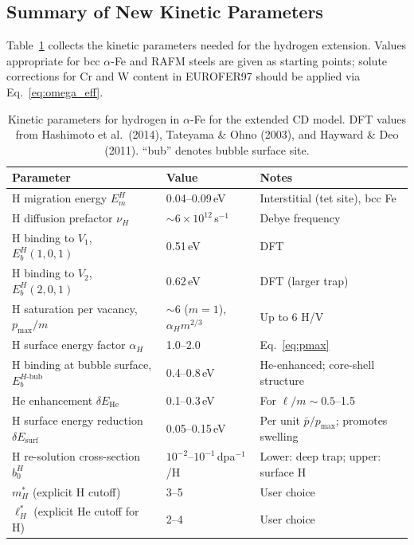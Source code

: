 \documentclass[pdflatex,sn-basic]{sn-jnl} %
\begin{document}
\subsection{Summary of New Kinetic Parameters}
\label{sec:H_params}

Table~\ref{tab:H_params} collects the kinetic parameters needed for the
hydrogen extension.  Values appropriate for bcc $\alpha$-Fe and RAFM
steels are given as starting points; solute corrections for Cr and W
content in EUROFER97 should be applied via Eq.~\eqref{eq:omega_eff}.

\begin{table}[htbp]
\centering
\caption{Kinetic parameters for hydrogen in $\alpha$-Fe for the extended
CD model.  DFT values from Hashimoto et al.\ (2014), Tateyama \& Ohno
(2003), and Hayward \& Deo (2011).  ``bub'' denotes bubble surface site.}
\label{tab:H_params}
\renewcommand{\arraystretch}{1.3}
\begin{tabular}{@{}p{5.5cm}ll@{}}
\toprule
\textbf{Parameter} & \textbf{Value} & \textbf{Notes} \\
\midrule
H migration energy $E_m^H$ & 0.04--0.09\,eV
  & Interstitial (tet site), bcc Fe \\
H diffusion prefactor $\nu_H$ & $\sim$$6\times10^{12}$\,s$^{-1}$
  & Debye frequency \\
H binding to $V_1$, $E_b^H(1,0,1)$ & 0.51\,eV & DFT \\
H binding to $V_2$, $E_b^H(2,0,1)$ & 0.62\,eV & DFT (larger trap) \\
H saturation per vacancy, $p_{\max}/m$ & $\sim$6 ($m=1$), $\alpha_H m^{2/3}$ & Up to 6 H/V \\
H surface energy factor $\alpha_H$ & 1.0--2.0 & Eq.~\eqref{eq:pmax} \\
H binding at bubble surface, $E_b^{H\text{-bub}}$ & 0.4--0.8\,eV
  & He-enhanced; core-shell structure \\
He enhancement $\delta E_{\mathrm{He}}$ & 0.1--0.3\,eV
  & For $\ell/m \sim 0.5$--1.5 \\
H surface energy reduction $\delta E_{\mathrm{surf}}$ & 0.05--0.15\,eV
  & Per unit $\bar{p}/p_{\max}$; promotes swelling \\
H re-solution cross-section $b_0^H$ & $10^{-2}$--$10^{-1}$\,dpa$^{-1}$/H
  & Lower: deep trap; upper: surface H \\
$m_H^*$ (explicit H cutoff) & 3--5 & User choice \\
$\ell_H^*$ (explicit He cutoff for H) & 2--4 & User choice \\
\bottomrule
\end{tabular}
\end{table}
\newpage
\end{document}

